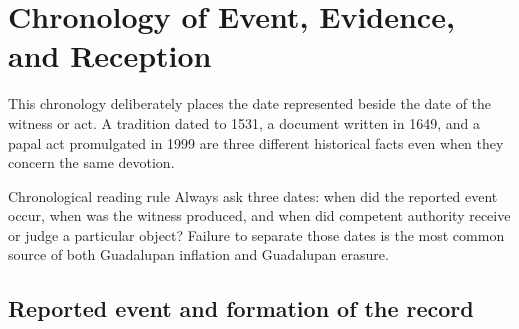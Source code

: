 \section{Chronology of Event, Evidence, and Reception}

This chronology deliberately places the date represented beside the date of the witness or act. A tradition dated to 1531, a document written in 1649, and a papal act promulgated in 1999 are three different historical facts even when they concern the same devotion.

\begin{studybox}{Chronological reading rule}
Always ask three dates: when did the reported event occur, when was the witness produced, and when did competent authority receive or judge a particular object? Failure to separate those dates is the most common source of both Guadalupan inflation and Guadalupan erasure.
\end{studybox}

\subsection{Reported event and formation of the record}

